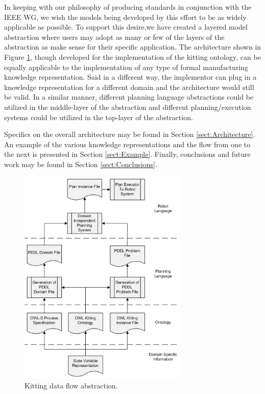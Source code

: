 \documentclass[a4paper, 10pt, conference]{ieeeconf}      %
\begin{document}
In keeping with our philosophy of producing standards in conjunction with the IEEE WG, we wish the models being developed by this effort to be as widely applicable as possible. To support this desire,we have
created a layered model abstraction where users may adopt as many or few of the layers of the abstraction as make sense for their
specific application.  The architecture shown in Figure \ref{fig:ProcessDataFlow}, though developed for the implementation of the kitting ontology, can be equally applicable to the implementation of any type of formal manufacturing knowledge representation. Said in a different way, the implementor can plug in a knowledge representation for a different domain and the architecture would still be valid. In a similar manner, different planning language abstractions could be utilized in the middle-layer of the
abstraction and different planning/execution systems could be utilized in the top-layer of the abstraction.

Specifics on the overall architecture may be found in Section \ref{sect:Architecture}. An example of the
various knowledge representations and the flow from one to the next is presented in Section \ref{sect:Example}. Finally,
conclusions and future work may be found in Section \ref{sect:Conclusions}.

\begin{figure}[htb]
\includegraphics[width=8cm]{images/ProcessDataFlowV2.jpg}
\caption{Kitting data flow abstraction.}
\label{fig:ProcessDataFlow}
\end{figure}
\end{document}
